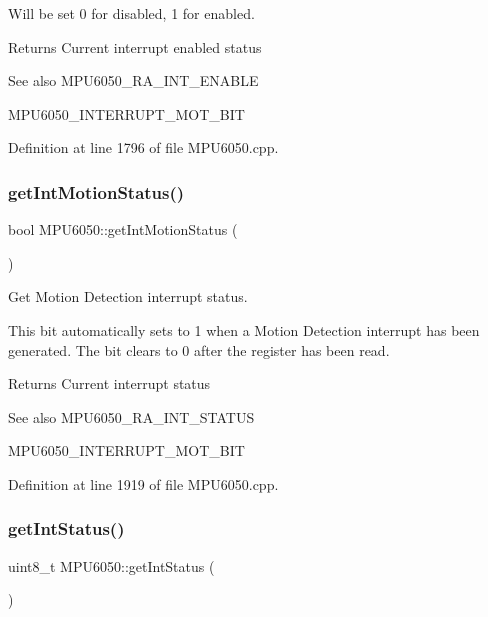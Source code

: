 Will be set 0 for disabled, 1 for enabled. \begin{DoxyReturn}{Returns}
Current interrupt enabled status 
\end{DoxyReturn}
\begin{DoxySeeAlso}{See also}
M\+P\+U6050\+\_\+\+R\+A\+\_\+\+I\+N\+T\+\_\+\+E\+N\+A\+B\+LE 

M\+P\+U6050\+\_\+\+I\+N\+T\+E\+R\+R\+U\+P\+T\+\_\+\+M\+O\+T\+\_\+\+B\+IT 
\end{DoxySeeAlso}


Definition at line 1796 of file M\+P\+U6050.\+cpp.

\mbox{\label{classMPU6050_ac0c0836aa0d237cac92d11591efd0d9f}} 
\subsubsection{\texorpdfstring{getIntMotionStatus()}{getIntMotionStatus()}}
{\footnotesize\ttfamily bool M\+P\+U6050\+::get\+Int\+Motion\+Status (\begin{DoxyParamCaption}{ }\end{DoxyParamCaption})}



Get Motion Detection interrupt status. 

This bit automatically sets to 1 when a Motion Detection interrupt has been generated. The bit clears to 0 after the register has been read. \begin{DoxyReturn}{Returns}
Current interrupt status 
\end{DoxyReturn}
\begin{DoxySeeAlso}{See also}
M\+P\+U6050\+\_\+\+R\+A\+\_\+\+I\+N\+T\+\_\+\+S\+T\+A\+T\+US 

M\+P\+U6050\+\_\+\+I\+N\+T\+E\+R\+R\+U\+P\+T\+\_\+\+M\+O\+T\+\_\+\+B\+IT 
\end{DoxySeeAlso}


Definition at line 1919 of file M\+P\+U6050.\+cpp.

\mbox{\label{classMPU6050_a550a735623cb1de950c72cd6931ee804}} 
\subsubsection{\texorpdfstring{getIntStatus()}{getIntStatus()}}
{\footnotesize\ttfamily uint8\+\_\+t M\+P\+U6050\+::get\+Int\+Status (\begin{DoxyParamCaption}{ }\end{DoxyParamCaption})}



